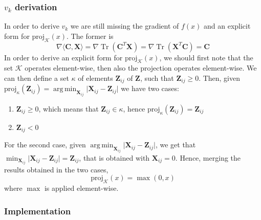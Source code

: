 \documentclass[12pt]{article}
\DeclareMathOperator*{\argmin}{arg\,min}
\DeclareMathOperator*{\tr}{Tr}
\newcommand{\boldZ}{\mathbf{Z}}
\newcommand{\boldX}{\mathbf{X}}
\newcommand{\boldC}{\mathbf{C}}
\newcommand*{\proj}{\text{proj}}
\begin{document}
\subsubsection{\texorpdfstring{$v_{k}$}{Lg} derivation}
In order to derive $v_k$ we are still missing the gradient of $f(x)$ and an explicit form for $\proj_{\mathcal{K}}(x)$. The former is
\begin{equation}
    \nabla \langle \boldC, \boldX \rangle = \nabla \tr(\boldC^T\boldX) = \nabla \tr(\boldX^T\boldC) = \boldC
\end{equation}
In order to derive an explicit form for $\proj_{\mathcal{K}}(x)$, we should first note that the set $\mathcal{K}$ operates element-wise, then also the projection operates element-wise. We can then define a set $\kappa$ of elements $\boldZ_{ij}$ of $\boldZ$, such that $\boldZ_{ij} \geq 0$. Then, given $\proj_{\kappa}(\boldZ_{ij}) = \argmin_{\boldX_{ij}} \lvert \boldX_{ij} - \boldZ_{ij} \rvert$ we have two cases:
\begin{enumerate}
    \item $\boldZ_{ij} \geq 0$, which means that $\boldZ_{ij} \in \kappa$, hence $\proj_{\kappa}(\boldZ_{ij}) = \boldZ_{ij}$
    \item $\boldZ_{ij} < 0$
\end{enumerate}
For the second case, given $\argmin_{\boldX_{ij}} \lvert \boldX_{ij} - \boldZ_{ij} \rvert$, we get that $\min_{\boldX_{ij}} \lvert \boldX_{ij} - \boldZ_{ij} \rvert = \boldZ_{ij}$, that is obtained with $\boldX_{ij} = 0$. Hence, merging the results obtained in the two cases,
\begin{equation}
    \proj_{\mathcal{K}}(x) = \max(0, x)
\end{equation}
where $\max$ is applied element-wise.

\subsubsection{Implementation}
\end{document}
